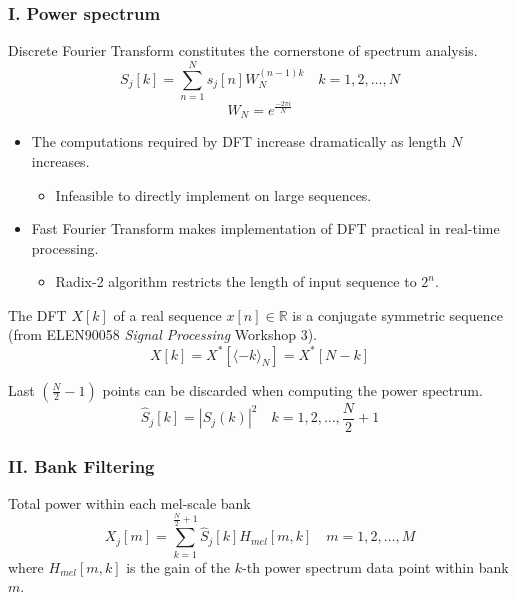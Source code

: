 
\begin{frame}
\frametitle{I. Power spectrum}

Discrete Fourier Transform constitutes the cornerstone of spectrum analysis.
\begin{equation}
S_j[k] = \sum_{n=1}^{N} s_j[n] W_N^{(n-1) k} \quad k = 1, 2, \dots, N
\end{equation}
\begin{equation}
W_N = e^{\frac{- 2\pi i}{N}}
\end{equation}

\begin{itemize}
	\item The computations required by DFT increase dramatically as length $N$ increases.
	\begin{itemize}
		\item Infeasible to directly implement on large sequences.
	\end{itemize}
	\item Fast Fourier Transform makes implementation of DFT practical in real-time processing.
	\begin{itemize}
		\item Radix-2 algorithm restricts the length of input sequence to $2^n$.
	\end{itemize}
\end{itemize}
\end{frame}


\begin{frame}
The DFT $X[k]$ of a real sequence $x[n] \in \mathbb{R}$ is a conjugate symmetric sequence (from ELEN90058 \textit{Signal Processing} Workshop 3).
\begin{equation}
X[k] = X^*[\langle-k\rangle_{N}] = X^*[N-k]
\end{equation}

Last $(\frac{N}{2} - 1)$ points can be discarded when computing the power spectrum.
\begin{equation}
\hat{S}_j[k] = |S_j(k)|^2 \quad k = 1, 2, \dots, \frac{N}{2} + 1
\end{equation}
\end{frame}


\begin{frame}
\frametitle{II. Bank Filtering}
Total power within each mel-scale bank
\begin{equation}
X_j[m] = \sum^{\frac{N}{2} + 1}_{k=1} \hat{S}_j[k] H_{mel}[m, k] \quad m = 1, 2, \dots, M
\end{equation}
where $H_{mel}[m, k]$ is the gain of the $k$-th power spectrum data point within bank $m$.
\end{frame}

